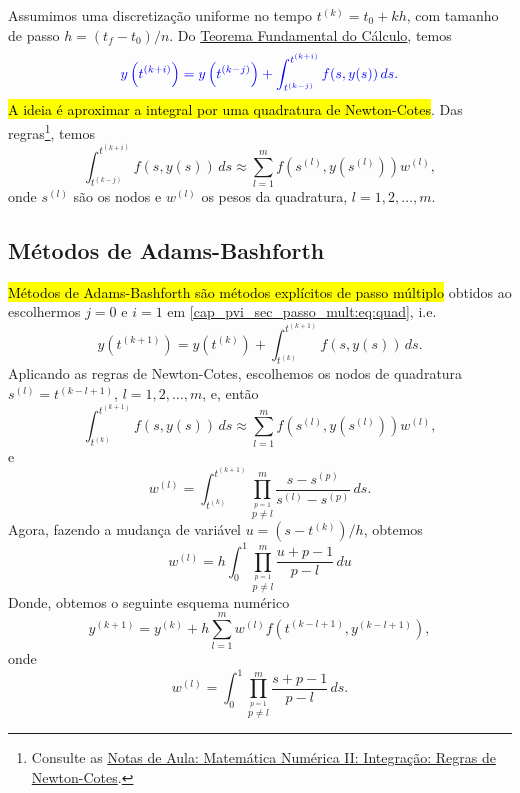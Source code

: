 Assumimos uma discretização uniforme no tempo $t^{(k)} = t_0 + kh$, com tamanho de passo $h = (t_f-t_0)/n$. Do \href{https://notaspedrok.com.br/notas/CalculoI/cap_int_sec_propint.html}{Teorema Fundamental do Cálculo}, temos
\begin{equation}\label{cap_pvi_sec_passo_mult:eq:tfc}\color{blue}y\left(t^{(k+i)}\right) = y\left(t^{(k-j)}\right) + \int_{t^{(k-j)}}^{t^{(k+i)}} f(s,y(s))\,ds.
\end{equation}
\hl{A ideia é aproximar a integral por uma quadratura de Newton}{\newton}\hl{-Cotes}{\cotes}. Das regras\footnote{Consulte as \href{https://notaspedrok.com.br/notas/MatematicaNumericaII/cap_integr_sec_NC.html}{Notas de Aula: Matemática Numérica II: Integração: Regras de Newton-Cotes}.}, temos
\begin{equation}\label{cap_pvi_sec_passo_mult:eq:quad}
  \int_{t^{(k-j)}}^{t^{(k+i)}} f(s,y(s))\,ds \approx \sum_{l=1}^{m} f\left(s^{(l)},y(s^{(l)})\right)w^{(l)},
\end{equation}
onde $s^{(l)}$ são os nodos e $w^{(l)}$ os pesos da quadratura, $l = 1, 2, \dotsc, m$.

\subsection{Métodos de Adams-Bashforth}

\hl{Métodos de Adams-Bashforth são métodos explícitos de passo múltiplo} obtidos ao escolhermos $j=0$ e $i=1$ em \eqref{cap_pvi_sec_passo_mult:eq:quad}, i.e.
\begin{equation}
  y\left(t^{(k+1)}\right) = y\left(t^{(k)}\right) + \int_{t^{(k)}}^{t^{(k+1)}} f(s,y(s))\,ds.
\end{equation}
Aplicando as regras de Newton-Cotes, escolhemos os nodos de quadratura $s^{(l)} = t^{(k-l+1)}$, $l = 1, 2, \dotsc, m$, e, então
\begin{equation}
  \int_{t^{(k)}}^{t^{(k+1)}} f(s,y(s))\,ds \approx \sum_{l=1}^{m} f\left(s^{(l)},y(s^{(l)})\right)w^{(l)},
\end{equation}
e
\begin{equation}
  w^{(l)} = \int_{t^{(k)}}^{t^{(k+1)}} \prod_{\overset{p=1}{p\neq l}}^m \frac{s-s^{(p)}}{s^{(l)}-s^{(p)}}\,ds.
\end{equation}
Agora, fazendo a mudança de variável $u=\left(s - t^{(k)}\right)/h$, obtemos
\begin{equation}
  w^{(l)} = h\int_{0}^{1} \prod_{\overset{p=1}{p\neq l}}^m \frac{u+p-1}{p-l}\,du
\end{equation}
Donde, obtemos o seguinte esquema numérico
\begin{equation}\label{cap_pvi_sec_passo_mult:eq:mult_passo_iter}
  y^{(k+1)} = y^{(k)} + h\sum_{l=1}^m w^{(l)}f(t^{(k-l+1)},y^{(k-l+1)}),
\end{equation}
onde
\begin{equation}
  w^{(l)} = \int_{0}^{1} \prod_{\overset{p=1}{p\neq l}}^m \frac{s+p-1}{p-l}\,ds.\label{cap_pvi_sec_passo_mult:eq:mult_passo_pesos}
\end{equation}

